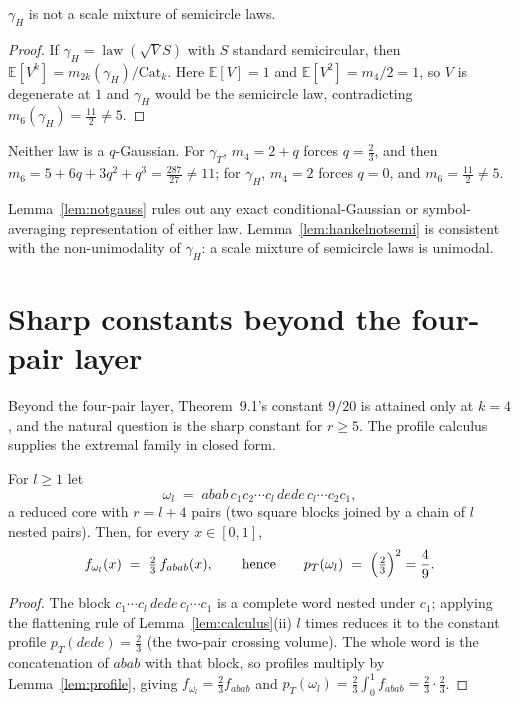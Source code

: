\begin{lemma}\label{lem:hankelnotsemi}
$\gamma_H$ is not a scale mixture of semicircle laws.
\end{lemma}

\begin{proof}
If $\gamma_H=\operatorname{law}(\sqrt V S)$ with $S$ standard semicircular,
then $\mathbb E[V^k]=m_{2k}(\gamma_H)/\mathrm{Cat}_k$.  Here
$\mathbb E[V]=1$ and $\mathbb E[V^2]=m_4/2=1$, so $V$ is degenerate at $1$
and $\gamma_H$ would be the semicircle law, contradicting
$m_6(\gamma_H)=\tfrac{11}2\ne5$.
\end{proof}

\begin{lemma}\label{lem:notq}
Neither law is a $q$-Gaussian.  For $\gamma_T$, $m_4=2+q$ forces
$q=\tfrac23$, and then $m_6=5+6q+3q^2+q^3=\tfrac{287}{27}\ne11$; for
$\gamma_H$, $m_4=2$ forces $q=0$, and $m_6=\tfrac{11}2\ne5$.
\end{lemma}

Lemma~\ref{lem:notgauss} rules out any exact conditional-Gaussian or
symbol-averaging representation of either law.
Lemma~\ref{lem:hankelnotsemi} is consistent with the non-unimodality of
$\gamma_H$: a scale mixture of semicircle laws is unimodal.

\section{Sharp constants beyond the four-pair layer}

Beyond the four-pair layer, Theorem~9.1's constant $9/20$ is attained only
at $k=4$, and the natural question is the sharp constant for $r\ge5$.  The
profile calculus supplies the extremal family in closed form.

\begin{proposition}\label{prop:family49}
For $l\ge1$ let
\[
\omega_l\;=\;abab\,c_1c_2\cdots c_l\,dede\,c_l\cdots c_2c_1 ,
\]
a reduced core with $r=l+4$ pairs (two square blocks joined by a chain of
$l$ nested pairs).  Then, for every $x\in[0,1]$,
\[
f_{\omega_l}(x)\;=\;\tfrac23\,f_{abab}(x),
\qquad\text{hence}\qquad
p_T(\omega_l)\;=\;\Bigl(\tfrac23\Bigr)^2=\frac49 .
\]
\end{proposition}

\begin{proof}
The block $c_1\cdots c_l\,dede\,c_l\cdots c_1$ is a complete word nested
under $c_1$; applying the flattening rule of
Lemma~\ref{lem:calculus}(ii) $l$ times reduces it to the constant profile
$p_T(dede)=\tfrac23$ (the two-pair crossing volume).  The whole word is
the concatenation of $abab$ with that block, so profiles multiply by
Lemma~\ref{lem:profile}, giving
$f_{\omega_l}=\tfrac23f_{abab}$ and
$p_T(\omega_l)=\tfrac23\int_0^1f_{abab}=\tfrac23\cdot\tfrac23$.
\end{proof}

